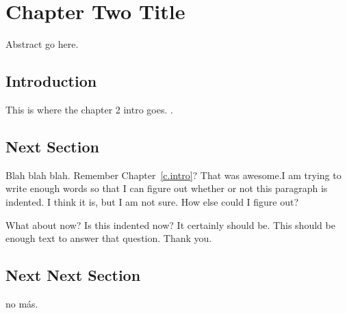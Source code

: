 \chapter{Chapter Two Title}
\label{c.xenon}

Abstract go here.

\section{Introduction}

This is where the chapter 2 intro goes.
\cite{williams12}.

\section{Next Section}
Blah blah blah. Remember Chapter~\ref{c.intro}? That was awesome.I am trying to write enough words so that I can figure out whether or not this paragraph is indented. I think it is, but I am not sure. How else could I figure out?

What about now? Is this indented now? It certainly should be.  This should be enough text to answer that question.  Thank you.
%

\section{Next Next Section}

no m\'{a}s.
